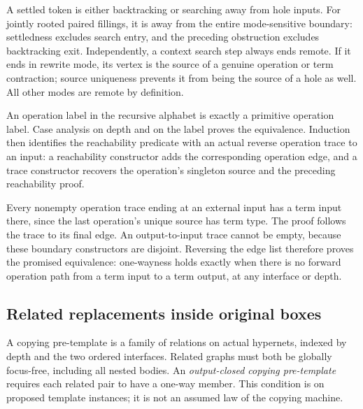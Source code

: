 A settled token is either backtracking or searching away from hole
inputs. For jointly rooted paired fillings, it is away from the entire
mode-sensitive boundary: settledness excludes search entry, and the preceding
obstruction excludes backtracking exit. Independently, a context search step
always ends remote. If it ends in rewrite mode, its vertex is the source
of a genuine operation or term contraction; source uniqueness prevents it
from being the source of a hole as well. All other modes are remote by
definition.



An operation label in the recursive alphabet is exactly a primitive
operation label. Case analysis on depth and on the label proves the
equivalence. Induction then identifies the reachability predicate with an
actual reverse operation trace to an input: a reachability constructor adds
the corresponding operation edge, and a trace constructor recovers the
operation's singleton source and the preceding reachability proof.



Every nonempty operation trace ending at an external input has a term
input there, since the last operation's unique source has term type. The
proof follows the trace to its final edge. An output-to-input trace cannot
be empty, because these boundary constructors are disjoint. Reversing the
edge list therefore proves the promised equivalence: one-wayness holds
exactly when there is no forward operation path from a term input to a
term output, at any interface or depth.



\subsection{Related replacements inside original boxes}

A copying pre-template is a family of relations on actual hypernets,
indexed by depth and the two ordered interfaces. Related graphs must both
be globally focus-free, including all nested bodies.
An \emph{output-closed copying pre-template} requires each related pair to
have a one-way member. This condition is on proposed template instances;
it is not an assumed law of the copying machine.

